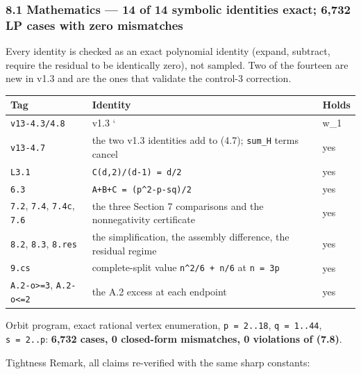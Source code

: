 \documentclass[
  9pt,
  a4paper,
]{article}
\newcounter{none} %
\begin{document}
\subsubsection{8.1 Mathematics --- 14 of 14 symbolic identities exact;
6,732 LP cases with zero
mismatches}\label{81-mathematics--14-of-14-symbolic-identities-exact-6732-lp-cases-with-zero-mismatches}

Every identity is checked as an exact polynomial identity (expand,
subtract, require the residual to be identically zero), not sampled. Two
of the fourteen are new in v1.3 and are the ones that validate the
control-3 correction.

{\def\LTcaptype{none} %
\begin{longtable}[]{@{}lll@{}}
\toprule\noalign{}
Tag & Identity & Holds \\
\midrule\noalign{}
\endhead
\bottomrule\noalign{}
\endlastfoot
\texttt{v13-4.3/4.8} & v1.3 ` & w\_1 \\
\texttt{v13-4.7} & the two v1.3 identities add to (4.7); \texttt{sum\_H}
terms cancel & yes \\
\texttt{L3.1} & \texttt{C(d,2)/(d-1)\ =\ d/2} & yes \\
\texttt{6.3} & \texttt{A+B+C\ =\ (p\^{}2-p-sq)/2} & yes \\
\texttt{7.2}, \texttt{7.4}, \texttt{7.4c}, \texttt{7.6} & the three
Section 7 comparisons and the nonnegativity certificate & yes \\
\texttt{8.2}, \texttt{8.3}, \texttt{8.res} & the simplification, the
assembly difference, the residual regime & yes \\
\texttt{9.cs} & complete-split value \texttt{n\^{}2/6\ +\ n/6} at
\texttt{n\ =\ 3p} & yes \\
\texttt{A.2-o\textgreater{}=3}, \texttt{A.2-o\textless{}=2} & the A.2
excess at each endpoint & yes \\
\end{longtable}
}

Orbit program, exact rational vertex enumeration, \texttt{p\ =\ 2..18},
\texttt{q\ =\ 1..44}, \texttt{s\ =\ 2..p}: \textbf{6,732 cases, 0
closed-form mismatches, 0 violations of (7.8)}.

Tightness Remark, all claims re-verified with the same sharp constants:
\end{document}
